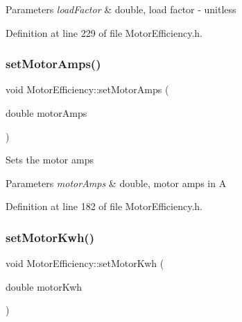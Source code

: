 \begin{DoxyParams}{Parameters}
{\em load\+Factor} & double, load factor -\/ unitless \\
\hline
\end{DoxyParams}


Definition at line 229 of file Motor\+Efficiency.\+h.

\mbox{\label{class_motor_efficiency_ac86aa8d6162e63eb440e07e557534c74}} 
\subsubsection{\texorpdfstring{set\+Motor\+Amps()}{setMotorAmps()}}
{\footnotesize\ttfamily void Motor\+Efficiency\+::set\+Motor\+Amps (\begin{DoxyParamCaption}\item[{double}]{motor\+Amps }\end{DoxyParamCaption})\hspace{0.3cm}{\ttfamily [inline]}}

Sets the motor amps


\begin{DoxyParams}{Parameters}
{\em motor\+Amps} & double, motor amps in A \\
\hline
\end{DoxyParams}


Definition at line 182 of file Motor\+Efficiency.\+h.

\mbox{\label{class_motor_efficiency_ab1c7507bac259565e43a6777d079148b}} 
\subsubsection{\texorpdfstring{set\+Motor\+Kwh()}{setMotorKwh()}}
{\footnotesize\ttfamily void Motor\+Efficiency\+::set\+Motor\+Kwh (\begin{DoxyParamCaption}\item[{double}]{motor\+Kwh }\end{DoxyParamCaption})\hspace{0.3cm}{\ttfamily [inline]}}

